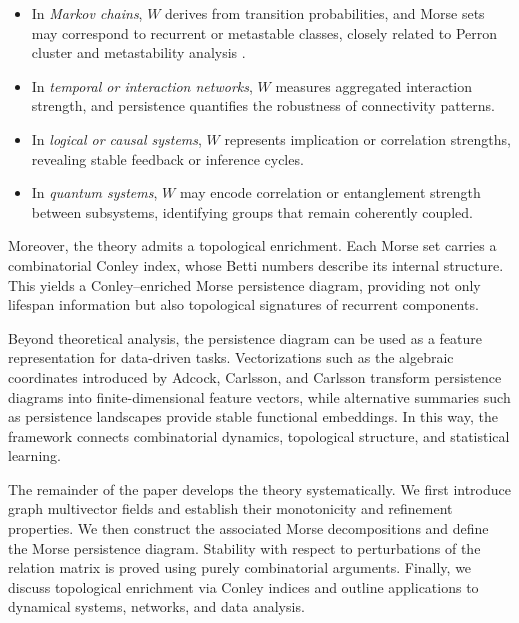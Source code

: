 \documentclass{article}
\theoremstyle{definition}
\theoremstyle{plain}
\theoremstyle{remark}
\newcommand{\1}{\mathbbm{1}}  %
\begin{document}
\begin{itemize}
  \item In \emph{Markov chains}, $W$ derives from transition
  probabilities, and Morse sets may correspond to recurrent or metastable
  classes, closely related to Perron cluster and metastability
  analysis \cite{schutte2003biomolecular}.
  
  \item In \emph{temporal or interaction networks}, $W$ measures
  aggregated interaction strength, and persistence quantifies the
  robustness of connectivity patterns.
  
  \item In \emph{logical or causal systems}, $W$ represents implication
  or correlation strengths, revealing stable feedback or inference
  cycles.
  
  \item In \emph{quantum systems}, $W$ may encode correlation or
  entanglement strength between subsystems, identifying groups that
  remain coherently coupled.
\end{itemize}

Moreover, the theory admits a topological enrichment.
Each Morse set carries a combinatorial Conley index,
whose Betti numbers describe its internal structure.
This yields a Conley--enriched Morse persistence diagram,
providing not only lifespan information but also topological signatures
of recurrent components.

Beyond theoretical analysis, the persistence diagram can be used as a
feature representation for data-driven tasks.
Vectorizations such as the algebraic coordinates introduced by
Adcock, Carlsson, and Carlsson \cite{adcock2013ring}
transform persistence diagrams into finite-dimensional feature vectors,
while alternative summaries such as persistence landscapes
\cite{bubenik2015statistical} provide stable functional embeddings.
In this way, the framework connects combinatorial dynamics,
topological structure, and statistical learning.

The remainder of the paper develops the theory systematically.
We first introduce graph multivector fields and establish their
monotonicity and refinement properties.
We then construct the associated Morse decompositions and define the
Morse persistence diagram.
Stability with respect to perturbations of the relation matrix is
proved using purely combinatorial arguments.
Finally, we discuss topological enrichment via Conley indices and
outline applications to dynamical systems, networks, and data analysis.
\end{document}
